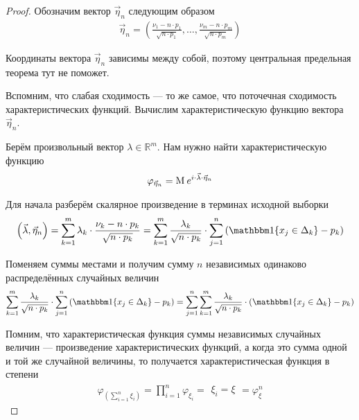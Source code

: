 \begin{proof}
  Обозначим вектор $\vec{\eta}_n$ следующим образом
  \begin{align*}
      \vec{\eta}_n = \left( \frac{\nu_1 - n \cdot p_1}{\sqrt{n \cdot p_1}},
      \dots, \frac{\nu_m - n \cdot p_m}{\sqrt{n \cdot p_m}} \right)
  \end{align*}

  Координаты вектора $\vec{\eta}_n$ зависимы между собой, поэтому центральная
  предельная теорема тут не поможет.

  Вспомним, что слабая сходимость --- то же самое, что поточечная сходимость
  характеристических функций. Вычислим характеристическую функцию вектора
  $\vec{\eta}_n$.

  Берём произвольный вектор $\lambda \in \mathbb{R}^m$. Нам нужно найти
  характеристическую функцию
  \begin{align*}
      \varphi_{\vec{\eta}_n}
      = \operatorname{M}_{} e^{i \cdot \vec{\lambda} \cdot \vec{\eta}_n}
  \end{align*}

  Для начала разберём скалярное произведение в терминах исходной выборки
  \begin{align*}
      \left( \vec{\lambda}, \vec{\eta}_n \right)
      = \sum_{k=1}^{m} \lambda_k \cdot \frac{\nu_k - n \cdot p_k}{
          \sqrt{n \cdot p_k}}
      = \sum_{k=1}^{m}\frac{\lambda_k}{\sqrt{n \cdot p_k}}
      \cdot \sum_{j=1}^{n}\left(
          \Indicator{x_j \in \Delta_k} - p_k \right)
  \end{align*}

  Поменяем суммы местами и получим сумму $n$ независимых одинаково
  распределённых случайных величин
  \begin{align*}
      \sum_{k=1}^{m}\frac{\lambda_k}{\sqrt{n \cdot p_k}}
      \cdot \sum_{j=1}^{n}\left(
          \Indicator{x_j \in \Delta_k} - p_k \right)
      = \sum_{j=1}^{n}\sum_{k=1}^{m}\frac{\lambda_k}{\sqrt{n \cdot p_k}}
          \cdot \left( \Indicator{x_j \in \Delta_k} - p_k \right)
  \end{align*}

  Помним, что характеристическая функция суммы независимых случайных величин
  --- произведение характеристических функций, а когда это сумма одной и той
  же случайной величины, то получается характеристическая функция в степени
  \begin{align*}
      \varphi_{\left( \sum_{i=1}^n \xi_i \right)}
      = \prod_{i=1}^n{\varphi_{\xi_i}}
      = \begin{array}{|c|}
      \xi_i = \xi
      \end{array}
      = \varphi_{\xi}^n
  \end{align*}


\end{proof}
